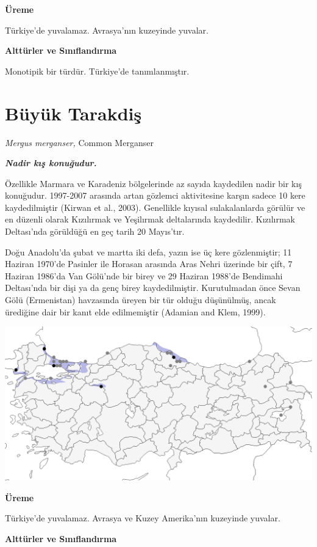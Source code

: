 \documentclass[
  a4paper,
  DIV=11,
  numbers=noendperiod]{scrartcl}
\begin{document}
\textbf{Üreme}

Türkiye'de yuvalamaz. Avrasya'nın kuzeyinde yuvalar.

\textbf{Alttürler ve Sınıflandırma}

Monotipik bir türdür. Türkiye'de tanımlanmıştır.

\section{Büyük Tarakdiş}\label{buxfcyuxfck-tarakdiux15f}

\emph{Mergus merganser,} Common Merganser

\textbf{\emph{Nadir kış konuğudur.}}

Özellikle Marmara ve Karadeniz bölgelerinde az sayıda kaydedilen nadir
bir kış konuğudur. 1997-2007 arasında artan gözlemci aktivitesine karşın
sadece 10 kere kaydedilmiştir (Kirwan et al., 2003). Genellikle kıyısal
sulakalanlarda görülür ve en düzenli olarak Kızılırmak ve Yeşilırmak
deltalarında kaydedilir. Kızılırmak Deltası'nda görüldüğü en geç tarih
20 Mayıs'tır.

Doğu Anadolu'da şubat ve martta iki defa, yazın ise üç kere
gözlenmiştir; 11 Haziran 1970'de Pasinler ile Horasan arasında Aras
Nehri üzerinde bir çift, 7 Haziran 1986'da Van Gölü'nde bir birey ve 29
Haziran 1988'de Bendimahi Deltası'nda bir dişi ya da genç birey
kaydedilmiştir. Kurutulmadan önce Sevan Gölü (Ermenistan) havzasında
üreyen bir tür olduğu düşünülmüş, ancak ürediğine dair bir kanıt elde
edilmemiştir (Adamian and Klem, 1999).

\includegraphics{images/harita_Mergus merganser.png}

\textbf{Üreme}

Türkiye'de yuvalamaz. Avrasya ve Kuzey Amerika'nın kuzeyinde yuvalar.

\textbf{Alttürler ve Sınıflandırma}
\end{document}
